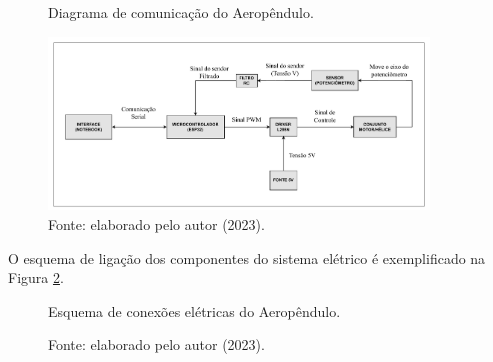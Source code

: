 \begin{figure}[!h]
	\centering
	\caption{Diagrama de comunicação do Aeropêndulo.}
	\includegraphics[width=0.9\textwidth, page=1]{Capitulos/3_hardware_softwares/3_figuras/diag_aerop.pdf}
	\caption*{Fonte: elaborado pelo autor (2023).}
	\label{fig3:image_11}
\end{figure}



O esquema de ligação dos componentes do sistema elétrico é exemplificado na Figura \ref{fig3:image_12}.

\begin{figure}[!h]
	\centering
    	\caption{Esquema de conexões elétricas do Aeropêndulo.}
	\caption*{Fonte: elaborado pelo autor (2023).}
	\label{fig3:image_12}
\end{figure}

\vspace{2cm}
